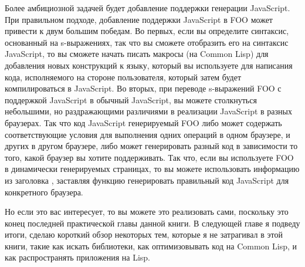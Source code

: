 Более амбициозной задачей будет добавление поддержки генерации JavaScript.  При правильном
подходе, добавление поддержки JavaScript в FOO может привести к двум большим победам.  Во
первых, если вы определите синтаксис, основанный на s-выражениях, так что вы сможете
отобразить его на синтаксис JavaScript, то вы сможете начать писать макросы (на Common
Lisp) для добавления новых конструкций к языку, который вы используете для написания кода,
исполняемого на стороне пользователя, который затем будет компилироваться в JavaScript. Во
вторых, при переводе s-выражений FOO с поддержкой JavaScript в обычный JavaScript, вы
можете столкнуться небольшими, но раздражающими различиями в реализации JavaScript в
разных браузерах.  Так что код JavaScript генерируемый FOO либо может содержать
соответствующие условия для выполнения одних операций в одном браузере, и других в другом
браузере, либо может генерировать разный код в зависимости то того, какой браузер вы
хотите поддерживать.  Так что, если вы используете FOO в динамически генерируемых
страницах, то вы можете использовать информацию из заголовка , заставляя
функцию  генерировать правильный код JavaScript для конкретного браузера.

Но если это вас интересует, то вы можете это реализовать сами, поскольку это конец
последней практической главы данной книги.  В следующей главе я подведу итоги, сделаю
короткий обзор некоторых тем, которые я не затрагивал в этой книги, такие как искать
библиотеки, как оптимизовывать код на Common Lisp, и как распространять приложения на
Lisp.

